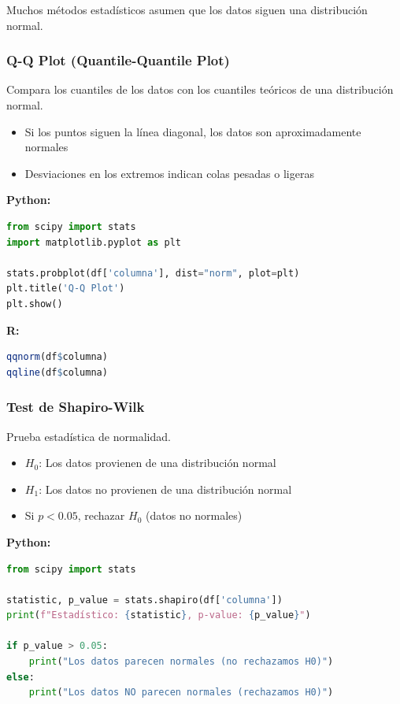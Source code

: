 \documentclass[a4paper,11pt]{article}
\begin{document}
Muchos métodos estadísticos asumen que los datos siguen una distribución normal.

\subsubsection{Q-Q Plot (Quantile-Quantile Plot)}

Compara los cuantiles de los datos con los cuantiles teóricos de una distribución normal.

\begin{itemize}
    \item Si los puntos siguen la línea diagonal, los datos son aproximadamente normales
    \item Desviaciones en los extremos indican colas pesadas o ligeras
\end{itemize}

\textbf{Python:}
\begin{lstlisting}[language=Python]
from scipy import stats
import matplotlib.pyplot as plt

stats.probplot(df['columna'], dist="norm", plot=plt)
plt.title('Q-Q Plot')
plt.show()
\end{lstlisting}

\textbf{R:}
\begin{lstlisting}[language=R]
qqnorm(df$columna)
qqline(df$columna)
\end{lstlisting}

\subsubsection{Test de Shapiro-Wilk}

Prueba estadística de normalidad.

\begin{itemize}
    \item $H_0$: Los datos provienen de una distribución normal
    \item $H_1$: Los datos no provienen de una distribución normal
    \item Si $p < 0.05$, rechazar $H_0$ (datos no normales)
\end{itemize}

\textbf{Python:}
\begin{lstlisting}[language=Python]
from scipy import stats

statistic, p_value = stats.shapiro(df['columna'])
print(f"Estadístico: {statistic}, p-value: {p_value}")

if p_value > 0.05:
    print("Los datos parecen normales (no rechazamos H0)")
else:
    print("Los datos NO parecen normales (rechazamos H0)")
\end{lstlisting}
\end{document}
